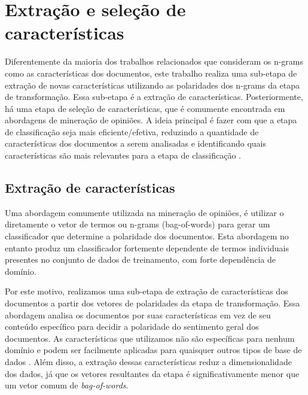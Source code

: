 \section{Extração e seleção de características}

Diferentemente da maioria dos trabalhos relacionados que consideram os n-grams como as características dos documentos, este trabalho realiza uma sub-etapa de extração de novas características utilizando as polaridades dos n-grams da etapa de transformação. Essa sub-etapa é a extração de características. Posteriormente, há uma etapa de seleção de características, que é comumente encontrada em abordagens de mineração de opiniões. A ideia principal é fazer com que a etapa de classificação seja mais eficiente/efetiva, reduzindo a quantidade de características dos documentos a serem analisadas e identificando quais características são mais relevantes para a etapa de classificação \cite{moraes2012document}. 

\subsection{Extração de características}

Uma abordagem comumente utilizada na mineração de opiniões, é utilizar o diretamente o vetor de termos ou n-grams (bag-of-words) para gerar um classificador que determine a polaridade dos documentos. Esta abordagem no entanto produz um classificador fortemente dependente de termos individuais presentes no conjunto de dados de treinamento, com forte dependência de domínio. 

Por este motivo, realizamos uma sub-etapa de extração de características dos documentos a partir dos vetores de polaridades da etapa de transformação. Essa abordagem analisa os documentos por suas características em vez de seu conteúdo específico para decidir a polaridade do sentimento geral dos documentos. As características que utilizamos não são específicas para nenhum domínio e podem ser facilmente aplicadas para quaisquer outros tipos de base de dados \cite{pang2002thumbs}. Além disso, a extração dessas características reduz a dimensionalidade dos dados, já que os vetores resultantes da etapa é significativamente menor que um vetor comum de \textit{bag-of-words}.

